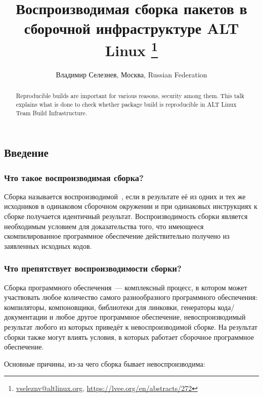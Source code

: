 \documentclass[10pt, a5paper]{article}
\begin{document}
\title{Воспроизводимая сборка пакетов в сборочной инфраструктуре ALT Linux \footnote{\url{vseleznv@altlinux.org}, \url{https://lvee.org/en/abstracts/272}}}
\author{Владимир Селезнев, Москва, Russian Federation}
\maketitle
\begin{abstract}
Reproducible builds are important for various reasons, security among them. This talk explains what is done to check whether package build is reproducible in ALT Linux Team Build Infra\-structure.
\end{abstract}
\subsection*{Введение}

\subsubsection*{Что такое воспроизводимая сборка?}

Сборка называется воспроизводимой~\cite{Seleznev-1}, если в результате её из одних и тех же исходников в одинаковом сборочном окружении и при одинаковых инструкциях к сборке получается идентичный результат.
Воспроизводимость сборки является необходимым условием для доказательства того, что имеющееся скомпилированное программное обеспечение действительно получено из заявленных исходных кодов.

\subsubsection*{Что препятствует воспроизводимости сборки?}

Сборка программного обеспечения~--- комплексный процесс, в котором может участвовать любое количество самого разнообразного программного обеспечения: компиляторы, компоновщики, библиотеки для линковки, генераторы кода/документации и любое другое программное обеспечение, невоспроизводимый результат любого из которых приведёт к невоспроизводимой сборке. На результат сборки также могут влиять условия, в которых работает сборочное программное обеспечение.

Основные причины, из-за чего сборка бывает невоспроизводима:
\end{document}
